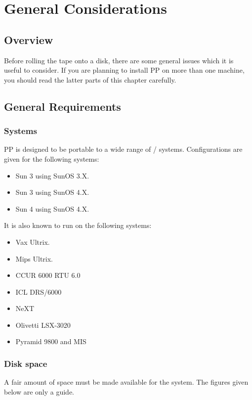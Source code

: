 \chapter {General Considerations}

\section {Overview}

Before rolling the tape onto a disk, there are some general issues which it
is useful to consider.  If you are planning to install PP on more than one
machine, you should read the latter parts of this chapter carefully.

\section {General Requirements}

\subsection{Systems}

PP is designed to be portable to a wide range of \unix/ systems.
Configurations are given for the following systems:
\begin{itemize}
\item	Sun 3 using SunOS 3.X.
\item	Sun 3 using SunOS 4.X.
\item	Sun 4 using SunOS 4.X.
\end{itemize}
It is also known to run on the following systems:
\begin{itemize}
\item	Vax Ultrix.
\item	Mips Ultrix.
\item	CCUR 6000 RTU 6.0
\item	ICL DRS/6000
\item	NeXT
\item	Olivetti LSX-3020
\item	Pyramid 9800 and MIS
\end{itemize}

\subsection {Disk space}

A fair amount of space must be made available for the system. The
figures given below are only a guide.

